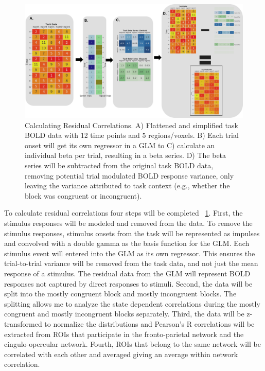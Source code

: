 \documentclass[phd,appendix,figures]{uithesis}
\begin{document}
\begin{figure}[H]%
	\centering
	\includegraphics[width=1\linewidth]{residual_correlations}
	\caption{Calculating Residual Correlations.
	A) Flattened and simplified task BOLD data with 12 time points and 5 regions/voxels.
	B) Each trial onset will get its own regressor in a GLM to
	C) calculate an individual beta per trial, resulting in a beta series.
	D) The beta series will be subtracted from the original task BOLD data, removing potential
	trial modulated BOLD response variance, only leaving the variance attributed to task context (e.g., whether the block was congruent or incongruent).}
	\label{fig:residual_correlations}
\end{figure}

To calculate residual correlations four steps will be completed ~\ref{fig:residual_correlations}.
First, the stimulus responses will be modeled and removed from the data.
To remove the stimulus responses, stimulus onsets from the task will be represented as impulses and convolved with a double gamma as the basis function for the GLM. 
Each stimulus event will entered into the GLM as its own regressor.
This ensures the trial-to-trial variance will be removed from the task data, and not just the mean response of a stimulus. 
The residual data from the GLM will represent BOLD responses not captured by direct responses to stimuli. 
Second, the data will be split into the mostly congruent block and mostly incongruent blocks.
The splitting allows me to analyze the state dependent correlations during the mostly congruent and mostly incongruent blocks separately.
Third, the data will be z-transformed to normalize the distributions and Pearson's R correlations will be extracted from ROIs that participate in the fronto-parietal network and the cingulo-opercular network.
Fourth, ROIs that belong to the same network will be correlated with each other and averaged giving an average within network correlation.
\end{document}
